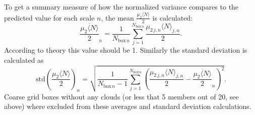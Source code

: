 \documentclass[a4paper, 12pt]{article}
\begin{document}
To get a summary measure of how the normalized variance compares to the predicted value for each scale $n$, the mean $\frac{\mu_{2} \langle N \rangle}{2}$ is calculated:
\begin{equation} \label{eq:mean_nvar_n}
 \overline{\frac{\mu_{2}\langle N \rangle}{2}}_n = \frac{1}{N_{\mathrm{box}\,n}} \sum_{j=1}^{N_{\mathrm{box}\,n}} \frac{\mu_{2\,j,n}\langle N \rangle_{j,n}}{2}.
\end{equation}
According to theory this value should be 1.
Similarly the standard deviation is calculated as
\begin{equation} \label{eq:std_nvar_n}
 \mathrm{std}\left(\frac{\mu_{2}\langle N \rangle}{2}\right)_n = \sqrt{\frac{1}{N_{\mathrm{box}\,n}-1} \sum_{j=1}^{N_{\mathrm{box}\,n}} \left(\frac{\mu_{2\,j, n} \langle N \rangle_{j,n} }{2} - \overline{\frac{\mu_{2}\langle N \rangle}{2}}_n \right)^2}.
\end{equation}
Coarse grid boxes without any clouds (or less that 5 members out of 20, see above) where excluded from these averages and standard deviation calculations. 
\end{document}
